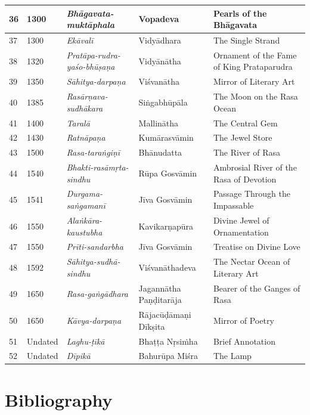 \begin{longtable}{|l|p{1.1cm}|p{1.98cm}|p{1.98cm}|p{1.98cm}|}
\hline
36 & 1300 & \textit{Bhāgavata-muktāphala} & Vopadeva & Pearls of the Bhāgavata \\
\hline
37 & 1300 & \textit{Ekāvalī} & Vidyādhara & The Single Strand \\
\hline
38 & 1320 & \textit{Pratāpa-rudra-yaśo-bhūṣaṇa} & Vidyānātha & Ornament of the Fame of King Prataparudra \\
\hline
39 & 1350 & \textit{Sāhitya-darpaṇa} & Viśvanātha & Mirror of Literary Art \\
\hline
40 & 1385 & \textit{Rasārṇava-sudhākara} & Siṅgabhūpāla & The Moon on the Rasa Ocean \\
\hline
41 & 1400 & \textit{Taralā} & Mallinātha\index{Mallinatha@Mallinātha} & The Central Gem \\
\hline
42 & 1430 & \textit{Ratnāpaṇa} & Kumārasvāmin\index{Kumarasvamin@Kumārasvāmin} & The Jewel Store \\
\hline
43 & 1500 & \textit{Rasa-taraṅgiṇī} & Bhānudatta\index{Bhanudatta@Bhānudatta} & The River of Rasa \\
\hline
44 & 1540 & \textit{Bhakti-rasāmṛta-sindhu} & Rūpa Gosvāmin & Ambrosial River of the Rasa of Devotion \\
\hline
45 & 1541 & \textit{Durgama-saṅgamanī} & Jīva Gosvāmin\index{Jiva Gosvamin@Jīva Gosvāmin} & Passage Through the Impassable \\
\hline
46 & 1550 & \textit{Alaṅkāra-kaustubha} & Kavikarṇapūra & Divine Jewel of Ornamentation \\
\hline
47 & 1550 & \textit{Prīti-sandarbha} & Jīva Gosvāmin & Treatise on Divine Love \\
\hline
48 & 1592 & \textit{Sāhitya-sudhā-sindhu} & Viśvanātha\-deva & The Nectar Ocean of Literary Art \\
\hline
49 & 1650 & \textit{Rasa-gaṅgādhara} & Jagannātha Paṇḍitarāja\index{Jagannatha Panditaraja@Jagannātha Paṇḍitarāja} & Bearer of the Ganges of Rasa \\
\hline
50 & 1650 & \textit{Kāvya-darpaṇa} & Rājacūḍāmaṇi Dīkṣita & Mirror of Poetry \\
\hline
51 & Undated & \textit{Laghu-ṭīkā} & Bhaṭṭa Nṛsiṁha\index{Bhatta Nrsimha@Bhaṭṭa Nṛsiṁha} & Brief Annotation \\
\hline
52 & Undated & \textit{Dīpikā} & Bahurūpa Miśra\index{Bahurupa Misra@Bahurūpa Miśra} & The Lamp \\
\hline
\end{longtable}


\section*{Bibliography}

